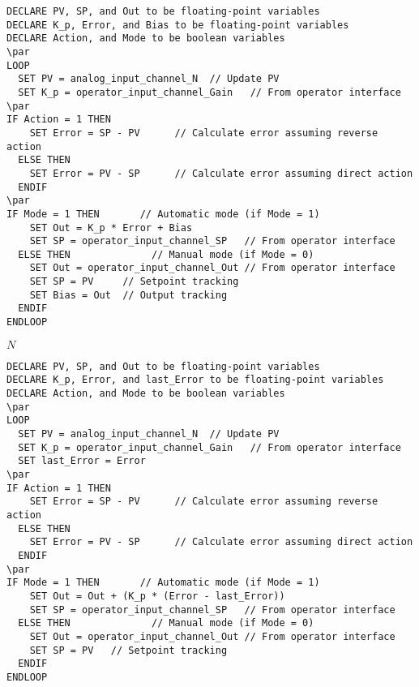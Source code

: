 \documentclass[12pt,a4paper,margin=2cm]{book}
\def\lthtmlcheckvsize{\ifdim\ht\sizebox<\vsize 
  \ifdim\wd\sizebox<\hsize\expandafter\hfill\fi \expandafter\vfill
  \else\expandafter\vss\fi}%
\begin{document}
{\newpage\clearpage
{}%
\begin{lstlisting}
DECLARE PV, SP, and Out to be floating-point variables
DECLARE K_p, Error, and Bias to be floating-point variables
DECLARE Action, and Mode to be boolean variables
\par
LOOP
  SET PV = analog_input_channel_N  // Update PV 
  SET K_p = operator_input_channel_Gain   // From operator interface
\par
IF Action = 1 THEN
    SET Error = SP - PV      // Calculate error assuming reverse action
  ELSE THEN
    SET Error = PV - SP      // Calculate error assuming direct action
  ENDIF
\par
IF Mode = 1 THEN       // Automatic mode (if Mode = 1)
    SET Out = K_p * Error + Bias
    SET SP = operator_input_channel_SP   // From operator interface
  ELSE THEN              // Manual mode (if Mode = 0)
    SET Out = operator_input_channel_Out // From operator interface 
    SET SP = PV     // Setpoint tracking
    SET Bias = Out  // Output tracking
  ENDIF
ENDLOOP
\end{lstlisting}%
\lthtmlfigureZ
\lthtmlcheckvsize\clearpage}

{\newpage\clearpage
{}%
$ N$%
\lthtmlindisplaymathZ
\lthtmlcheckvsize\clearpage}

{\newpage\clearpage
{}%
\begin{lstlisting}
DECLARE PV, SP, and Out to be floating-point variables
DECLARE K_p, Error, and last_Error to be floating-point variables
DECLARE Action, and Mode to be boolean variables
\par
LOOP
  SET PV = analog_input_channel_N  // Update PV 
  SET K_p = operator_input_channel_Gain   // From operator interface
  SET last_Error = Error
\par
IF Action = 1 THEN
    SET Error = SP - PV      // Calculate error assuming reverse action
  ELSE THEN
    SET Error = PV - SP      // Calculate error assuming direct action
  ENDIF
\par
IF Mode = 1 THEN       // Automatic mode (if Mode = 1)
    SET Out = Out + (K_p * (Error - last_Error))
    SET SP = operator_input_channel_SP   // From operator interface
  ELSE THEN              // Manual mode (if Mode = 0)
    SET Out = operator_input_channel_Out // From operator interface 
    SET SP = PV   // Setpoint tracking
  ENDIF
ENDLOOP
\end{lstlisting}%
\lthtmlfigureZ
\lthtmlcheckvsize\clearpage}
\end{document}
